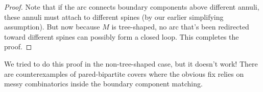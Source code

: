 \documentclass[12pt]{amsart}
\theoremstyle{definition}
\begin{document}
\begin{proof}
Note that if the arc connects boundary components above different annuli, these
annuli must attach to different spines (by our earlier simplifying assumption).
But now because $M$ is tree-shaped, no arc that's been redirected toward
different spines can possibly form a closed loop. This completes the proof.

\end{proof}

We tried to do this proof in the non-tree-shaped case, but it doesn't work!
There are counterexamples of pared-bipartite covers where the obvious fix
relies on messy combinatorics inside the boundary component matching.

%
%
%
\end{document}
